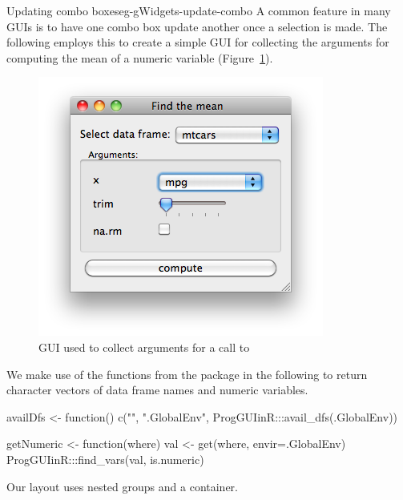 \begin{example}{Updating combo boxes}{eg-gWidgets-update-combo}
  A common feature in many GUIs is to have one combo box update
  another once a selection is made. The following employs this to
  create a simple GUI for collecting the arguments for computing the mean of a numeric variable
  (Figure~\ref{fig:gWidgets-mean-default}).
  
  \begin{figure}
    \centering
    \includegraphics[width=.4\textwidth]{fig-gWidgets-mean-default.png}
    \caption{GUI used to collect arguments for a call to
      }
    \label{fig:gWidgets-mean-default}
  \end{figure}
  
  We  make use of the functions from the  package
  in the following to return character vectors of data frame names and
  numeric variables.

\begin{Schunk}
\begin{Sinput}
 availDfs <- function() {
   c("", ".GlobalEnv", ProgGUIinR:::avail_dfs(.GlobalEnv))
 }
\end{Sinput}
\end{Schunk}
\begin{Schunk}
\begin{Sinput}
 getNumeric <- function(where) {
   val <- get(where, envir=.GlobalEnv)
   ProgGUIinR:::find_vars(val, is.numeric)
 }
\end{Sinput}
\end{Schunk}

Our layout uses nested groups and a  container.
\begin{Schunk}
\end{Schunk}


\end{example}
